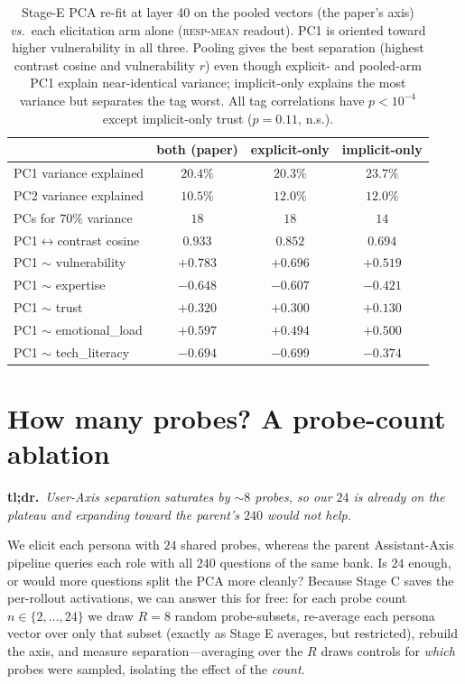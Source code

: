 \documentclass{article}
\newcommand{\respmean}{\textsc{resp-mean}}
\newcommand{\vs}{\emph{vs.}\ }
\begin{document}
\begin{table}[h]
\centering\small
\caption{Stage-E PCA re-fit at layer 40 on the pooled vectors (the paper's axis)
\vs each elicitation arm alone (\respmean{} readout). PC1 is oriented toward higher
vulnerability in all three. Pooling gives the best separation (highest contrast
cosine and vulnerability $r$) even though explicit- and pooled-arm PC1 explain
near-identical variance; implicit-only explains the most variance but separates the
tag worst. All tag correlations have $p<10^{-4}$ except implicit-only trust
($p{=}0.11$, n.s.).}
\label{tab:perarm}
\begin{tabular}{lccc}
\toprule
 & \textbf{both (paper)} & \textbf{explicit-only} & \textbf{implicit-only} \\
\midrule
PC1 variance explained              & $20.4\%$ & $20.3\%$ & $\mathbf{23.7\%}$ \\
PC2 variance explained              & $10.5\%$ & $12.0\%$ & $12.0\%$ \\
PCs for $70\%$ variance             & $18$ & $18$ & $14$ \\
PC1$\leftrightarrow$contrast cosine & $\mathbf{0.933}$ & $0.852$ & $0.694$ \\
\midrule
PC1 $\sim$ vulnerability            & $\mathbf{+0.783}$ & $+0.696$ & $+0.519$ \\
PC1 $\sim$ expertise                & $-0.648$ & $-0.607$ & $-0.421$ \\
PC1 $\sim$ trust                    & $+0.320$ & $+0.300$ & $+0.130$ \\
PC1 $\sim$ emotional\_load          & $+0.597$ & $+0.494$ & $+0.500$ \\
PC1 $\sim$ tech\_literacy           & $-0.694$ & $-0.699$ & $-0.374$ \\
\bottomrule
\end{tabular}
\end{table}

\section{How many probes? A probe-count ablation}\label{app:probes}

\noindent\textbf{tl;dr.}~\emph{User-Axis separation saturates by ${\sim}8$ probes, so
our $24$ is already on the plateau and expanding toward the parent's $240$ would not
help.}\par\medskip
We elicit each persona with $24$ shared probes, whereas the parent Assistant-Axis
pipeline queries each role with all $240$ questions of the same bank. Is $24$
enough, or would more questions split the PCA more cleanly? Because Stage C saves
the per-rollout activations, we can answer this for free: for each probe count
$n\in\{2,\dots,24\}$ we draw $R{=}8$ random probe-subsets, re-average each persona
vector over only that subset (exactly as Stage E averages, but restricted), rebuild
the axis, and measure separation---averaging over the $R$ draws controls for
\emph{which} probes were sampled, isolating the effect of the \emph{count}.
\end{document}
